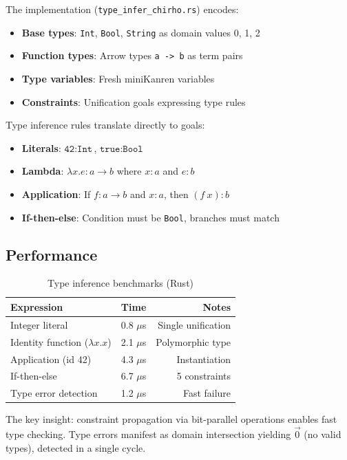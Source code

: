 \documentclass[11pt,a4paper]{article}
\begin{document}
The implementation (\texttt{type\_infer\_chirho.rs}) encodes:
\begin{itemize}
  \item \textbf{Base types}: \texttt{Int}, \texttt{Bool}, \texttt{String} as domain values 0, 1, 2
  \item \textbf{Function types}: Arrow types \texttt{a -> b} as term pairs
  \item \textbf{Type variables}: Fresh miniKanren variables
  \item \textbf{Constraints}: Unification goals expressing type rules
\end{itemize}

Type inference rules translate directly to goals:
\begin{itemize}
  \item \textbf{Literals}: $\texttt{42} : \texttt{Int}$, $\texttt{true} : \texttt{Bool}$
  \item \textbf{Lambda}: $\lambda x.e : a \to b$ where $x:a$ and $e:b$
  \item \textbf{Application}: If $f : a \to b$ and $x : a$, then $(f~x) : b$
  \item \textbf{If-then-else}: Condition must be \texttt{Bool}, branches must match
\end{itemize}

\subsection{Performance}

\begin{table}[H]
\centering
\begin{tabular}{lrr}
\toprule
\textbf{Expression} & \textbf{Time} & \textbf{Notes} \\
\midrule
Integer literal & 0.8 $\mu$s & Single unification \\
Identity function ($\lambda x.x$) & 2.1 $\mu$s & Polymorphic type \\
Application (id 42) & 4.3 $\mu$s & Instantiation \\
If-then-else & 6.7 $\mu$s & 5 constraints \\
Type error detection & 1.2 $\mu$s & Fast failure \\
\bottomrule
\end{tabular}
\caption{Type inference benchmarks (Rust)}
\label{tab:type_inference}
\end{table}

The key insight: constraint propagation via bit-parallel operations enables fast type checking.
Type errors manifest as domain intersection yielding $\vec{0}$ (no valid types), detected in a single cycle.
\end{document}
